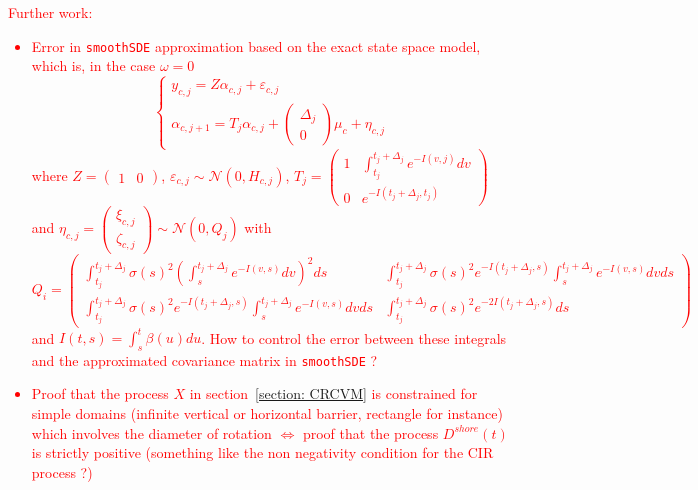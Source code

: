 \documentclass[11pt]{article}
\newcommand {\1}{\mathbb{1}}
\theoremstyle{definition}
\theoremstyle{remark}
\theoremstyle{remark}
\begin{document}
\textcolor{red}{Further work: 
\begin{itemize}
	\item Error in \texttt{smoothSDE} approximation based on the exact state space model, which is, in the case $\omega=0$ 
	\[
	\left\{
	\begin{array}{l}
		y_{c,j}=Z\alpha_{c,j}+\varepsilon_{c,j} \\
		\alpha_{c,j+1}=T_j \alpha_{c,j}+\begin{pmatrix} \Delta_j \\ 0 \end{pmatrix} \mu_c+\eta_{c,j} 
	\end{array}
	\right.
	\]
	where $Z=\begin{pmatrix} 1 & 0 \end{pmatrix}$, $\varepsilon_{c,j} \sim \mathcal{N}(0,H_{c,j})$, 
	$T_j=\begin{pmatrix} 
		1 & \int_{t_j}^{t_j+\Delta_j} e^{-I(v,j)}dv \\
		0 & e^{-I(t_j+\Delta_j,t_j)}
	\end{pmatrix}$  and $\eta_{c,j}=\begin{pmatrix} \xi_{c,j} \\ \zeta_{c,j} \end{pmatrix} \sim \mathcal{N}(0,Q_j)$ with
	\[Q_i=\begin{pmatrix}
		\int_{t_j}^{t_j+\Delta_j} \sigma(s)^2 \left(\int_{s}^{t_j+\Delta_j} e^{-I(v,s)} dv\right)^2 ds
		& \int_{t_j}^{t_j+\Delta_j} \sigma(s)^2e^{-I(t_j+\Delta_j,s)} \int_s^{t_j+\Delta_j} e^{-I(v,s)} dv ds \\
		\int_{t_j}^{t_j+\Delta_j} \sigma(s)^2e^{-I(t_j+\Delta_j,s)} \int_s^{t_j+\Delta_j} e^{-I(v,s)} dv ds & \int_{t_j}^{t_j+\Delta_j} \sigma(s)^2 e^{-2I(t_j+\Delta_j,s)} ds
	\end{pmatrix}
	\]
	and $I(t,s)=\int_{s}^{t} \beta(u) du$.
	How to control the error between these integrals and the approximated covariance matrix in \texttt{smoothSDE} ?
	\item Proof that the process $X$ in section~\ref{section: CRCVM} is constrained for simple domains (infinite vertical or horizontal barrier, rectangle for instance) which involves the diameter of rotation $\Leftrightarrow$ proof that the process $D^{shore}(t)$ is strictly positive (something like the non negativity condition for the CIR process ?)
\end{itemize}}
\end{document}
